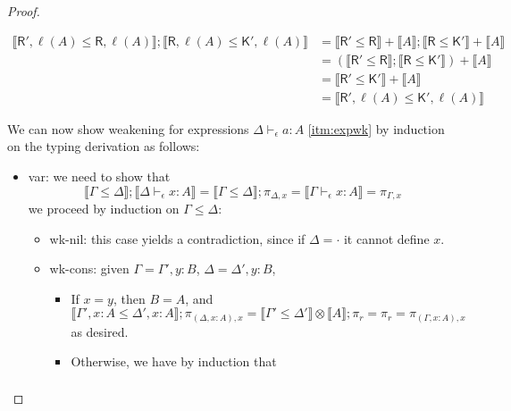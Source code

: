 \documentclass[acmsmall,screen,review]{acmart}
\newcommand{\ms}[1]{\ensuremath{\mathsf{#1}}}
\newcommand{\bhyp}[2]{#1 : #2}
\newcommand{\hasty}[4]{#1 \vdash_{#2} #3: {#4}}
\newcommand{\brle}[1]{{\textsf{#1}}}
\newcommand{\dnt}[1]{\llbracket{#1}\rrbracket}
\begin{document}
\begin{proof}
\begin{itemize}
\begin{itemize}
      \begin{equation}
        \begin{aligned}
        \dnt{\ms{R}', \ell(A) \leq \ms{R}, \ell(A)} ; \dnt{\ms{R}, \ell(A) \leq \ms{K}', \ell(A)}
        & = \dnt{\ms{R}' \leq \ms{R}} + \dnt{A} ; \dnt{\ms{R} \leq \ms{K}'} + \dnt{A} \\
        & = (\dnt{\ms{R}' \leq \ms{R}} ; \dnt{\ms{R} \leq \ms{K}'}) + \dnt{A} \\
        & = \dnt{\ms{R}' \leq \ms{K}'} + \dnt{A} \\
        & = \dnt{\ms{R}', \ell(A) \leq \ms{K}', \ell(A)}
        \end{aligned}
      \end{equation}
    \end{itemize}
  \end{itemize}
  We can now show weakening for expressions $\hasty{\Delta}{\epsilon}{a}{A}$ \ref{itm:expwk} by 
  induction on the typing derivation as follows:
  \begin{itemize}
    \item \brle{var}: we need to show that
    \begin{equation}
      \dnt{\Gamma \leq \Delta} ; \dnt{\hasty{\Delta}{\epsilon}{x}{A}}
      = \dnt{\Gamma \leq \Delta} ; \pi_{\Delta, x}
      = \dnt{\hasty{\Gamma}{\epsilon}{x}{A}}
      = \pi_{\Gamma, x}
    \end{equation}
    we proceed by induction on $\Gamma \leq \Delta$:
    \begin{itemize}
      \item \brle{wk-nil}: this case yields a contradiction, since if $\Delta = \cdot$ it cannot
      define $x$.
      \item \brle{wk-cons}: given $\Gamma = \Gamma', \bhyp{y}{B}$, $\Delta = \Delta',
      \bhyp{y}{B}$,
      \begin{itemize}
        \item If $x = y$, then $B = A$, and
        \begin{equation}
          \dnt{\Gamma', \bhyp{x}{A} \leq \Delta', \bhyp{x}{A}} 
          ; \pi_{(\Delta, \bhyp{x}{A}), x}
          = \dnt{\Gamma' \leq \Delta'} \otimes \dnt{A} ; \pi_r
          = \pi_r
          = \pi_{(\Gamma, \bhyp{x}{A}), x}
        \end{equation}
        as desired.
        \item Otherwise, we have by induction that
        \begin{equation}
          \begin{aligned}

\end{aligned}
\end{equation}
\end{itemize}
\end{itemize}
\end{itemize}
\end{proof}
\end{document}
